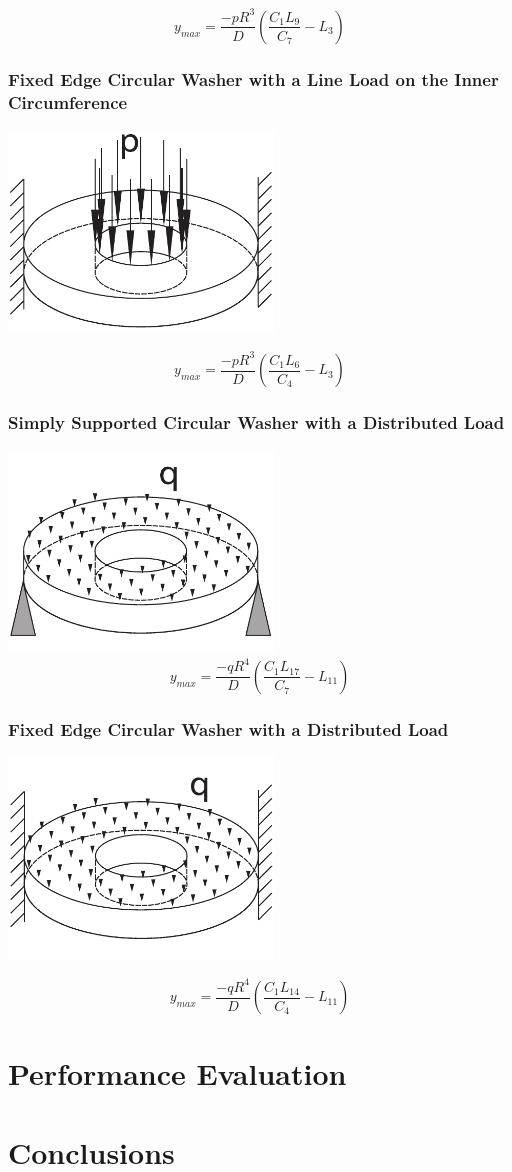 \documentclass[10pt,letterpaper]{report}
\numberwithin{equation}{chapter}
\begin{document}
\[y_{max}=\frac{-p R^3}{D}\left(\frac{C_1 L_9}{C_7} - L_3\right)\]

\subsection{Fixed Edge Circular Washer with a Line Load on the Inner Circumference }
\includegraphics[width=200pt]{3D_fixed_point_Hole.pdf}

\[y_{max}=\frac{-p R^3}{D}\left(\frac{C_1 L_6}{C_4} - L_3\right)\]


\subsection{Simply Supported Circular Washer with a Distributed Load }
\includegraphics[width=200pt]{3D_pinned_pressure_Hole.pdf}
\[y_{max}=\frac{-q R^4}{D}\left(\frac{C_1 L_{17}}{C_7} - L_{11}\right)\]


\subsection{Fixed Edge Circular Washer with a Distributed Load }

\includegraphics[width=200pt]{3D_fixed_pressure_Hole.pdf}

\[y_{max}=\frac{-q R^4}{D}\left(\frac{C_1 L_{14}}{C_4} - L_{11}\right)\]




\chapter{Performance Evaluation}

\chapter{Conclusions}
\end{document}
